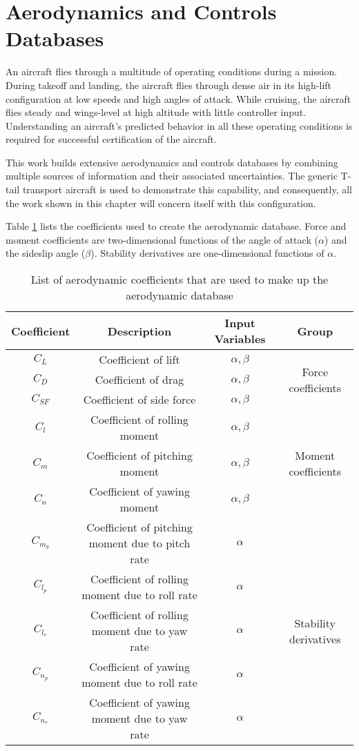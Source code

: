 \section{Aerodynamics and Controls Databases}

An aircraft flies through a multitude of operating conditions during a mission. During takeoff and landing, the aircraft flies through dense air in its high-lift configuration at low speeds and high angles of attack. 
While cruising, the aircraft flies steady and wings-level at high altitude with little controller input. 
Understanding an aircraft's predicted behavior in all these operating conditions is required for successful certification of the aircraft. 

This work builds extensive aerodynamics and controls databases by combining multiple sources of information and their associated uncertainties.
The generic T-tail transport aircraft is used to demonstrate this capability, and consequently, all the work shown in this chapter will concern itself with this configuration.

Table \ref{tab:aero_db} lists the coefficients used to create the aerodynamic database.
Force and moment coefficients are two-dimensional functions of the angle of attack ($\alpha$) and the sideslip angle ($\beta$).
Stability derivatives are one-dimensional functions of $\alpha$. 
\begin{table}
    \renewcommand{\arraystretch}{1.2}
    \centering
    \begin{tabular}{ c|c|c|c } 
         Coefficient & Description & Input Variables & Group \\ 
         \hline
         $C_L$ & Coefficient of lift & $\alpha, \beta$  & \multirow{3}{5em}{Force coefficients}\\ 
         $C_D$ & Coefficient of drag & $\alpha, \beta$  \\
         $C_{SF}$ & Coefficient of side force & $\alpha, \beta$  \\ \hline
         $C_l$ & Coefficient of rolling moment & $\alpha, \beta$  & \multirow{3}{5em}{Moment coefficients} \\
         $C_m$ & Coefficient of pitching moment & $\alpha, \beta$  \\
         $C_n$ & Coefficient of yawing moment & $\alpha, \beta$  \\ \hline
         $C_{m_q}$ & Coefficient of pitching moment due to pitch rate & $\alpha$  & \multirow{5}{5em}{Stability derivatives}\\
         $C_{l_p}$ & Coefficient of rolling moment due to roll rate & $\alpha$ \\
         $C_{l_r}$ & Coefficient of rolling moment due to yaw rate & $\alpha$ \\
         $C_{n_p}$ & Coefficient of yawing moment due to roll rate & $\alpha$ \\
         $C_{n_r}$ & Coefficient of yawing moment due to yaw rate & $\alpha$
         \\
    \end{tabular}
    \caption{List of aerodynamic coefficients that are used to make up the aerodynamic database}
    \label{tab:aero_db}
\end{table}

